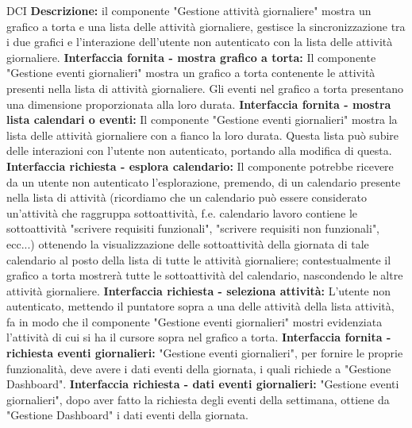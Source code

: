 \begin{listaPersonale}{DCI}
    \textbf{Descrizione:} il componente "Gestione attività giornaliere" mostra un grafico a torta e una lista delle attività giornaliere, gestisce la sincronizzazione tra i due grafici e l'interazione dell'utente non autenticato con la lista delle attività giornaliere.
    \textbf{Interfaccia fornita - mostra grafico a torta:} Il componente "Gestione eventi giornalieri" mostra un grafico a torta contenente le attività presenti nella lista di attività giornaliere. Gli eventi nel grafico a torta presentano una dimensione proporzionata alla loro durata.
    \textbf{Interfaccia fornita - mostra lista calendari o eventi:} Il componente "Gestione eventi giornalieri" mostra la lista delle attività giornaliere con a fianco la loro durata. Questa lista può subire delle interazioni con l'utente non autenticato, portando alla modifica di questa.
    \textbf{Interfaccia richiesta - esplora calendario:} Il componente potrebbe ricevere da un utente non autenticato l'esplorazione, premendo, di un calendario presente nella lista di attività (ricordiamo che un calendario può essere considerato un'attività che raggruppa sottoattività, f.e. calendario lavoro contiene le sottoattività "scrivere requisiti funzionali", "scrivere requisiti non funzionali", ecc...) ottenendo la visualizzazione delle sottoattività della giornata di tale calendario al posto della lista di tutte le attività giornaliere; contestualmente il grafico a torta mostrerà tutte le sottoattività del calendario, nascondendo le altre attività giornaliere.
    \textbf{Interfaccia richiesta - seleziona attività:} L'utente non autenticato, mettendo il puntatore sopra a una delle attività della lista attività, fa in modo che il componente "Gestione eventi giornalieri" mostri evidenziata l'attività di cui si ha il cursore sopra nel grafico a torta.
    \textbf{Interfaccia fornita - richiesta eventi giornalieri:} "Gestione eventi giornalieri", per fornire le proprie funzionalità, deve avere i dati eventi della giornata, i quali richiede a "Gestione Dashboard".
    \textbf{Interfaccia richiesta - dati eventi giornalieri:} "Gestione eventi giornalieri", dopo aver fatto la richiesta degli eventi della settimana, ottiene da "Gestione Dashboard" i dati eventi della giornata.



\end{listaPersonale}
